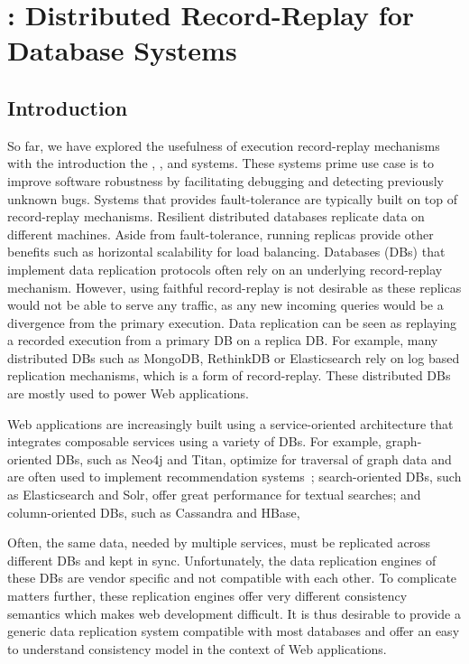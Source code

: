 \chapter{\synapse: Distributed Record-Replay for Database Systems}
\label{ch:synapse}

\section{Introduction}
\label{synapse:sec:intro}

So far, we have explored the usefulness of execution record-replay mechanisms
with the introduction the \scribe, \racepro, and \dora
systems. These systems prime use case is to improve software robustness by
facilitating debugging and detecting previously unknown bugs.
Systems that provides fault-tolerance are typically built on top of
record-replay mechanisms.
Resilient distributed databases replicate data on
different machines. Aside from fault-tolerance, running replicas provide other
benefits such as horizontal scalability for load balancing. Databases (DBs) that
implement data replication protocols often rely on an underlying record-replay
mechanism.
However, using faithful record-replay is not desirable as these replicas
would not be able to serve any traffic, as any new incoming queries would be a
divergence from the primary execution.
Data replication can be seen as replaying a recorded execution from
a primary DB on a replica DB.
For example, many distributed DBs such
as MongoDB, RethinkDB or Elasticsearch rely on log based replication mechanisms,
which is a form of record-replay.
These distributed DBs are mostly used to power Web applications.

Web applications are increasingly built using a service-oriented
architecture that integrates composable services using a variety of DBs.
For example, graph-oriented DBs, such as Neo4j and Titan, optimize for
traversal of graph data and are often used to implement recommendation
systems~\cite{db-revolution}; search-oriented DBs, such as
Elasticsearch and Solr, offer great performance for textual searches; and
column-oriented DBs, such as Cassandra and HBase,

Often, the same data, needed by multiple services, must be replicated across
different DBs and kept in sync. Unfortunately, the data replication engines of
these DBs are vendor specific and not compatible with each other. To complicate
matters further, these replication engines offer very different consistency
semantics which makes web development difficult.
It is thus desirable to provide a generic data replication system compatible
with most databases and offer an easy to understand consistency model in the
context of Web applications.

